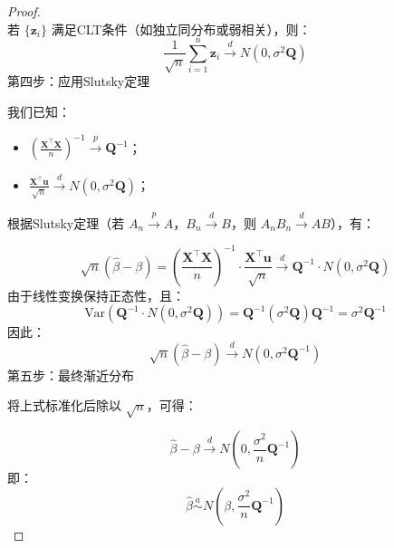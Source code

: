 \begin{proof}
\begin{equation}
\end{equation}
若 $\{\mathbf{z}_i\}$ 满足CLT条件（如独立同分布或弱相关），则：
\begin{equation}
\frac{1}{\sqrt{n}} \sum_{i=1}^n \mathbf{z}_i \overset{d}{\to} N(0, \sigma^2 \mathbf{Q})
\end{equation}
第四步：应用Slutsky定理
\begin{flushleft}
我们已知：
\end{flushleft}
\begin{itemize}
    \item $\left( \frac{\mathbf{X}^\top \mathbf{X}}{n} \right)^{-1} \overset{p}{\to} \mathbf{Q}^{-1}$；
    \item $\frac{\mathbf{X}^\top \mathbf{u}}{\sqrt{n}} \overset{d}{\to} N(0, \sigma^2 \mathbf{Q})$；
\end{itemize}
\begin{flushleft}
根据Slutsky定理（若 $A_n \overset{p}{\to} A$，$B_n \overset{d}{\to} B$，则 $A_n B_n \overset{d}{\to} AB$），有：
\end{flushleft}
\begin{equation}
\sqrt{n}(\hat{\beta} - \beta) = \left( \frac{\mathbf{X}^\top \mathbf{X}}{n} \right)^{-1} \cdot \frac{\mathbf{X}^\top \mathbf{u}}{\sqrt{n}} \overset{d}{\to} \mathbf{Q}^{-1} \cdot N(0, \sigma^2 \mathbf{Q})
\end{equation}
由于线性变换保持正态性，且：
\begin{equation}
\text{Var}(\mathbf{Q}^{-1} \cdot N(0, \sigma^2 \mathbf{Q})) = \mathbf{Q}^{-1} (\sigma^2 \mathbf{Q}) \mathbf{Q}^{-1} = \sigma^2 \mathbf{Q}^{-1}
\end{equation}
因此：
\begin{equation}
\sqrt{n}(\hat{\beta} - \beta) \overset{d}{\to} N(0, \sigma^2 \mathbf{Q}^{-1})
\end{equation}
第五步：最终渐近分布
\begin{flushleft}
将上式标准化后除以 $\sqrt{n}$，可得：
\end{flushleft}
\begin{equation}
\hat{\beta} - \beta \overset{d}{\to} N\left(0, \frac{\sigma^2}{n} \mathbf{Q}^{-1} \right)
\end{equation}
即：
\begin{equation}
\hat{\beta} \overset{a}{\sim} N\left( \beta, \frac{\sigma^2}{n} \mathbf{Q}^{-1} \right)
\end{equation}

\end{proof}

